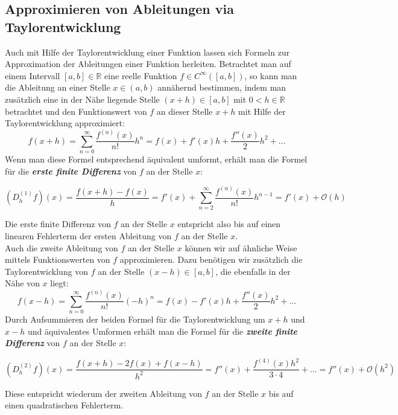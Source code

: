 \documentclass{scrartcl}
\begin{document}
\subsection{Approximieren von Ableitungen via Taylorentwicklung}
\label{ssec:herleitung2}
Auch mit Hilfe der Taylorentwicklung einer Funktion lassen sich Formeln zur Approximation der Ableitungen einer Funktion herleiten. Betrachtet man auf einem Intervall $[a,b] \in \mathbb{R}$ eine reelle Funktion $f \in C^\infty([a,b])$, so kann man die Ableitung an einer Stelle $x \in (a,b)$ annähernd bestimmen, indem man zusätzlich eine in der Nähe liegende Stelle $(x+h) \in [a,b]$ mit $0<h \in \mathbb{R}$ betrachtet und den Funktionswert von $f$ an dieser Stelle $x+h$ mit Hilfe der Taylorentwicklung approximiert:
\[f(x+h) = \sum_{n=0}^{\infty}\frac{f^{(n)}(x)}{n!}h^n = f(x)+f'(x)h+\frac{f''(x)}{2}h^2+...\]
Wenn man diese Formel entsprechend äquivalent umformt, erhält man die Formel für die \textbf{\textit{erste finite Differenz}} von $f$ an der Stelle $x$:
\begin{shaded}
\[(D_h^{(1)}f)(x) = \frac{f(x+h)-f(x)}{h} = f'(x)+\sum_{n=2}^{\infty}\frac{f^{(n)}(x)}{n!}h^{n-1}=f'(x)+\mathcal{O}(h)\;\]
\end{shaded}
Die erste finite Differenz von $f$ an der Stelle $x$ entspricht also bis auf einen linearen Fehlerterm der ersten Ableitung von $f$ an der Stelle $x$. \\
Auch die zweite Ableitung von $f$ an der Stelle $x$ können wir auf ähnliche Weise mittels Funktionswerten von $f$ approximieren. Dazu benötigen wir zusätzlich die Taylorentwicklung von $f$ an der Stelle $(x-h) \in [a,b]$, die ebenfalls in der Nähe von $x$ liegt:
\[f(x-h) = \sum_{n=0}^{\infty}\frac{f^{(n)}(x)}{n!}(-h)^n = f(x)-f'(x)h+\frac{f''(x)}{2}h^2+...\]
Durch Aufsummieren der beiden Formel für die Taylorentwicklung um $x+h$ und $x-h$ und äquivalentes Umformen erhält man die Formel für die \textbf{\textit{zweite finite Differenz}} von $f$ an der Stelle $x$:
\begin{shaded}
\[(D_h^{(2)}f)(x) = \frac{f(x+h)-2f(x)+f(x-h)}{h^2} = f''(x)+\frac{f^{(4)}(x)h^2}{3\cdot4}+...=f''(x)+\mathcal{O}(h^2)\;\]
\end{shaded}
Diese entspricht wiederum der zweiten Ableitung von $f$ an der Stelle $x$ bis auf einen quadratischen Fehlerterm.\cite{ppi}
\end{document}
